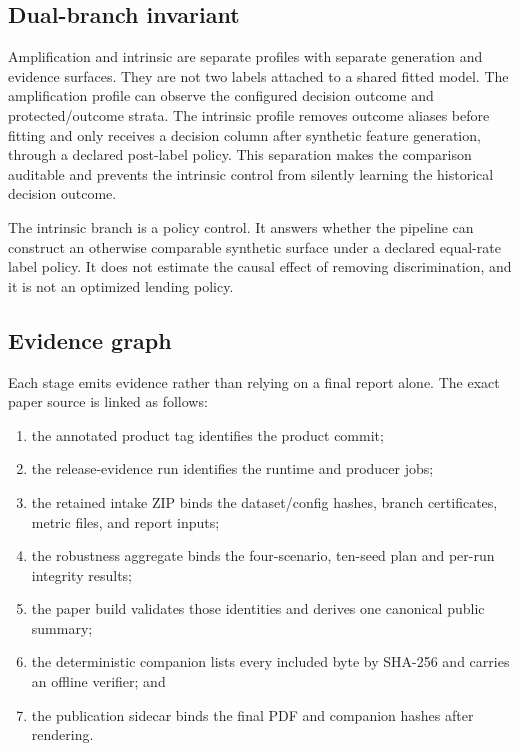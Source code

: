 \subsection{Dual-branch invariant}

Amplification and intrinsic are separate profiles with separate generation and evidence surfaces.
They are not two labels attached to a shared fitted model. The amplification profile can observe the
configured decision outcome and protected/outcome strata. The intrinsic profile removes outcome
aliases before fitting and only receives a decision column after synthetic feature generation,
through a declared post-label policy. This separation makes the comparison auditable and prevents
the intrinsic control from silently learning the historical decision outcome.

The intrinsic branch is a policy control. It answers whether the pipeline can construct an
otherwise comparable synthetic surface under a declared equal-rate label policy. It does not
estimate the causal effect of removing discrimination, and it is not an optimized lending policy.

\subsection{Evidence graph}

Each stage emits evidence rather than relying on a final report alone. The exact paper source is
linked as follows:

\begin{enumerate}
  \item the annotated product tag identifies the product commit;
  \item the release-evidence run identifies the runtime and producer jobs;
  \item the retained intake ZIP binds the dataset/config hashes, branch certificates, metric files,
    and report inputs;
  \item the robustness aggregate binds the four-scenario, ten-seed plan and per-run integrity
    results;
  \item the paper build validates those identities and derives one canonical public summary;
  \item the deterministic companion lists every included byte by SHA-256 and carries an offline
    verifier; and
  \item the publication sidecar binds the final PDF and companion hashes after rendering.
\end{enumerate}

